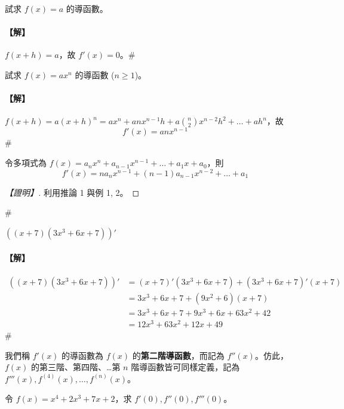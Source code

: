 \begin{example}\label{ex:b6s-2-14}
試求 $f(x)=a$ 的導函數。
\end{example}

\paragraph{【解】}
$f(x+h)=a$，故 $f'(x)=0$。\hfill$\#$

\begin{example}\label{ex:b6s-2-15}
試求 $f(x)=ax^n$ 的導函數 ($n \ge 1$)。
\end{example}

\paragraph{【解】}
$f(x+h) = a(x+h)^n = ax^n + anx^{n-1}h + a\binom{n}{2}x^{n-2}h^2 + \dots + ah^n$，故
\[ f'(x) = anx^{n-1} \]\hfill$\#$

\begin{corollary}\label{cor:b6s-2-poly-diff}
令多項式為 $f(x) = a_n x^n + a_{n-1} x^{n-1} + \dots + a_1 x + a_0$，則
\[ f'(x) = n a_n x^{n-1} + (n-1)a_{n-1} x^{n-2} + \dots + a_1 \]
\end{corollary}

\begin{proof}[【證明】]
利用推論 1 與例 1, 2。
\end{proof}\hfill$\#$

\begin{example}\label{ex:b6s-2-16}
$((x+7)(3x^3+6x+7))'$
\end{example}

\paragraph{【解】}
\begin{align*}
((x+7)(3x^3+6x+7))' &= (x+7)'(3x^3+6x+7) + (3x^3+6x+7)'(x+7) \\
&= 3x^3+6x+7 + (9x^2+6)(x+7) \\
&= 3x^3+6x+7 + 9x^3+6x+63x^2+42 \\
&= 12x^3+63x^2+12x+49
\end{align*}
\hfill$\#$

我們稱 $f'(x)$ 的導函數為 $f(x)$ 的\textbf{第二階導函數}，而記為 $f''(x)$。仿此，$f(x)$ 的第三階、第四階、\dots 第 $n$ 階導函數皆可同樣定義，記為 $f'''(x), f^{(4)}(x), \dots, f^{(n)}(x)$。

\begin{example}\label{ex:b6s-2-17}
令 $f(x)=x^4+2x^3+7x+2$，求 $f'(0), f''(0), f'''(0)$。
\end{example}

